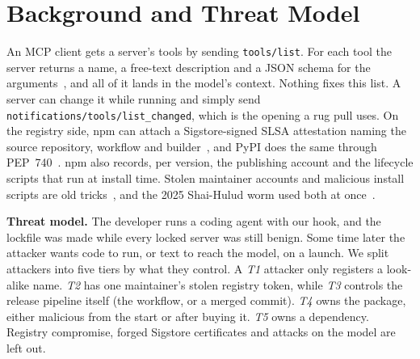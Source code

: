 \documentclass[conference]{IEEEtran}
\newcommand{\code}[1]{\texttt{#1}}
\begin{document}





\section{Background and Threat Model}
\label{sec:background}
An MCP client gets a server's tools by sending \code{tools/list}. For each tool the server returns a name, a
free-text description and a JSON schema for the arguments~\cite{mcpspec2025tools}, and all of it lands in the model's
context. Nothing fixes this list. A server can change it while running and simply send
\code{notifications/tools/list\_changed}, which is the opening a rug pull uses. On the
registry side, npm can attach a Sigstore-signed SLSA attestation naming the source repository, workflow and
builder~\cite{npmprovenance,slsa2023provenance,newman2022sigstore}, and PyPI does the same through PEP~740~\cite{pep740}.
npm also records, per version, the publishing account and the lifecycle scripts that run at install time. Stolen maintainer accounts and malicious
install scripts are old tricks~\cite{ohm2020backstabber,ladisa2023sok,zahan2022weak,zimmermann2019small}, and the 2025
Shai-Hulud worm used both at once~\cite{cisa2025shaihulud}.

\textbf{Threat model.} The developer runs a coding agent with our hook, and the lockfile was made while every
locked server was still benign. Some time later the attacker wants code to run, or text to reach the model, on a
launch. We split attackers into five tiers by what they control. A \emph{T1} attacker only registers a look-alike name.
\emph{T2} has one maintainer's stolen registry token, while \emph{T3} controls the release pipeline itself (the workflow,
or a merged commit). \emph{T4} owns the package, either malicious from the start or after buying it. \emph{T5} owns a
dependency. Registry compromise, forged Sigstore certificates and attacks on the model are left out.

\end{document}
